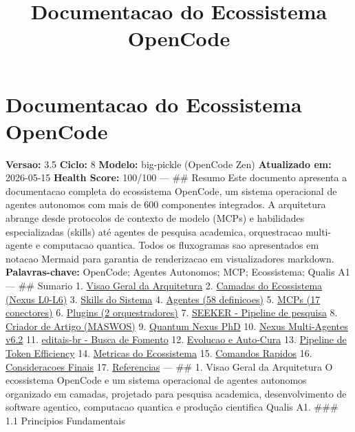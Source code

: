 \documentclass[
  12pt,
]{article}
\title{Documentacao do Ecossistema OpenCode}
\author{}
\date{}
\begin{document}
\maketitle

{
\setcounter{tocdepth}{3}
\tableofcontents
}
\section{Documentacao do Ecossistema
OpenCode}\label{documentacao-do-ecossistema-opencode}

\textbf{Versao:} 3.5 \textbar{} \textbf{Ciclo:} 8 \textbar{}
\textbf{Modelo:} big-pickle (OpenCode Zen) \textbf{Atualizado em:}
2026-05-15 \textbar{} \textbf{Health Score:} 100/100 --- \#\# Resumo
Este documento apresenta a documentacao completa do ecossistema
OpenCode, um sistema operacional de agentes autonomos com mais de 600
componentes integrados. A arquitetura abrange desde protocolos de
contexto de modelo (MCPs) e habilidades especializadas (skills) até
agentes de pesquisa academica, orquestracao multi-agente e computacao
quantica. Todos os fluxogramas sao apresentados em notacao Mermaid para
garantia de renderizacao em visualizadores markdown.
\textbf{Palavras-chave:} OpenCode; Agentes Autonomos; MCP; Ecossistema;
Qualis A1 --- \#\# Sumario 1.
\hyperref[1-visao-geral-da-arquitetura]{Visao Geral da Arquitetura} 2.
\hyperref[2-camadas-do-ecossistema]{Camadas do Ecossistema (Nexus
L0-L6)} 3. \hyperref[3-skills-do-sistema]{Skills do Sistema} 4.
\hyperref[4-agentes]{Agentes (58 definicoes)} 5. \hyperref[5-mcps]{MCPs
(17 conectores)} 6. \hyperref[6-plugins]{Plugins (2 orquestradores)} 7.
\hyperref[7-seeker-pipeline-de-pesquisa]{SEEKER - Pipeline de pesquisa}
8. \hyperref[8-criador-de-artigo-maswos]{Criador de Artigo (MASWOS)} 9.
\hyperref[9-quantum-nexus-phd]{Quantum Nexus PhD} 10.
\hyperref[10-nexus-multi-agentes]{Nexus Multi-Agentes v6.2} 11.
\hyperref[11-editais-br]{editais-br - Busca de Fomento} 12.
\hyperref[12-evolucao-e-auto-cura]{Evolucao e Auto-Cura} 13.
\hyperref[13-pipeline-de-token-efficiency]{Pipeline de Token Efficiency}
14. \hyperref[14-metricas-do-ecossistema]{Metricas do Ecossistema} 15.
\hyperref[15-comandos-rapidos]{Comandos Rapidos} 16.
\hyperref[16-consideracoes-finais]{Consideracoes Finais} 17.
\hyperref[17-referencias]{Referencias} --- \#\# 1. Visao Geral da
Arquitetura O ecossistema OpenCode e um sistema operacional de agentes
autonomos organizado em camadas, projetado para pesquisa academica,
desenvolvimento de software agentico, computacao quantica e produção
cientifica Qualis A1. \#\#\# 1.1 Principios Fundamentais \textbar{}
\end{document}
